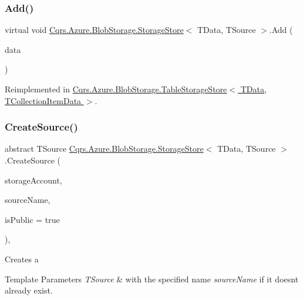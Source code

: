 \subsubsection{\texorpdfstring{Add()}{Add()}\hspace{0.1cm}{\footnotesize\ttfamily [2/2]}}
{\footnotesize\ttfamily virtual void \hyperlink{classCqrs_1_1Azure_1_1BlobStorage_1_1StorageStore}{Cqrs.\+Azure.\+Blob\+Storage.\+Storage\+Store}$<$ T\+Data, T\+Source $>$.Add (\begin{DoxyParamCaption}\item[{I\+Enumerable$<$ T\+Data $>$}]{data }\end{DoxyParamCaption})\hspace{0.3cm}{\ttfamily [virtual]}}



Reimplemented in \hyperlink{classCqrs_1_1Azure_1_1BlobStorage_1_1TableStorageStore_a2b10c02a19150d5a68e6dcb4810ea8a1}{Cqrs.\+Azure.\+Blob\+Storage.\+Table\+Storage\+Store$<$ T\+Data, T\+Collection\+Item\+Data $>$}.

\mbox{\label{classCqrs_1_1Azure_1_1BlobStorage_1_1StorageStore_a07903b6c3eca8d49878deb6e2e5719e0}} 
\subsubsection{\texorpdfstring{Create\+Source()}{CreateSource()}}
{\footnotesize\ttfamily abstract T\+Source \hyperlink{classCqrs_1_1Azure_1_1BlobStorage_1_1StorageStore}{Cqrs.\+Azure.\+Blob\+Storage.\+Storage\+Store}$<$ T\+Data, T\+Source $>$.Create\+Source (\begin{DoxyParamCaption}\item[{Cloud\+Storage\+Account}]{storage\+Account,  }\item[{string}]{source\+Name,  }\item[{bool}]{is\+Public = {\ttfamily true} }\end{DoxyParamCaption})\hspace{0.3cm}{\ttfamily [protected]}, {}}



Creates a 
\begin{DoxyTemplParams}{Template Parameters}
{\em T\+Source} & with the specified name {\itshape source\+Name}  if it doesn\textquotesingle{}t already exist. \\
\hline
\end{DoxyTemplParams}



